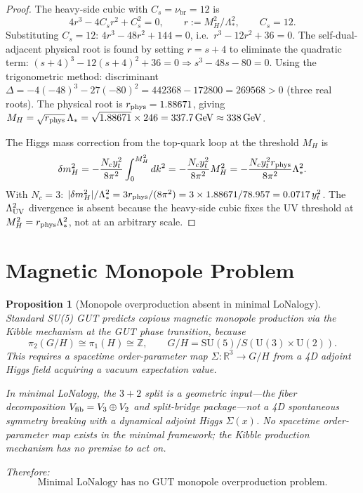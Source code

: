 \documentclass[12pt]{article}
\theoremstyle{plain}
\newtheorem{proposition}[theorem]{Proposition}
\theoremstyle{definition}
\numberwithin{equation}{section}
\newcommand{\br}{\mathrm{br}}
\begin{document}
\begin{proof}
The heavy-side cubic with $C_s=\nu_\br=12$ is
\[
4r^3 - 4C_s r^2 + C_s^2 = 0,\qquad r:=M_H^2/\Lambda_*^2,\qquad C_s=12.
\]
Substituting $C_s=12$: $4r^3-48r^2+144=0$, i.e.\ $r^3-12r^2+36=0$.
The self-dual-adjacent physical root is found by setting $r=s+4$ to eliminate the quadratic term:
$(s+4)^3-12(s+4)^2+36=0\Rightarrow s^3-48s-80=0$.
Using the trigonometric method: discriminant $\Delta=-4(-48)^3-27(-80)^2=442368-172800=269568>0$ (three real roots).
The physical root is $r_{\rm phys}=1.88671$, giving $M_H=\sqrt{r_{\rm phys}}\,\Lambda_*=\sqrt{1.88671}\times246=337.7\,\mathrm{GeV}\approx338\,\mathrm{GeV}$.

The Higgs mass correction from the top-quark loop at the threshold $M_H$ is
\[
\delta m_H^2 = -\frac{N_c y_t^2}{8\pi^2}\int_0^{M_H^2}dk^2 = -\frac{N_c y_t^2}{8\pi^2}M_H^2
= -\frac{N_c y_t^2 r_{\rm phys}}{8\pi^2}\Lambda_*^2.
\]
With $N_c=3$: $|\delta m_H^2|/\Lambda_*^2=3r_{\rm phys}/(8\pi^2)=3\times1.88671/78.957=0.0717\,y_t^2$.
The $\Lambda_{\rm UV}^2$ divergence is absent because the heavy-side cubic fixes the UV threshold at $M_H^2=r_{\rm phys}\Lambda_*^2$, not at an arbitrary scale.
\end{proof}

\section{Magnetic Monopole Problem}\label{sec:monopole}

\begin{proposition}[Monopole overproduction absent in minimal LoNalogy]\label{prop:monopole}
Standard SU(5) GUT predicts copious magnetic monopole production via the Kibble mechanism at the GUT phase transition, because
\[
\pi_2(G/H) \cong \pi_1(H) \cong \mathbb{Z}, \qquad G/H = \mathrm{SU}(5)/S(\mathrm{U}(3)\times\mathrm{U}(2)).
\]
This requires a spacetime order-parameter map $\Sigma:\mathbb{R}^3\to G/H$ from a 4D adjoint Higgs field acquiring a vacuum expectation value.

In minimal LoNalogy, the $3+2$ split is a \emph{geometric input}---the fiber decomposition $V_{\rm fib}=V_3\oplus V_2$ and split-bridge package---not a 4D spontaneous symmetry breaking with a dynamical adjoint Higgs $\Sigma(x)$.  No spacetime order-parameter map exists in the minimal framework; the Kibble production mechanism has no premise to act on.

Therefore:
\[
\boxed{\text{Minimal LoNalogy has no GUT monopole overproduction problem.}}
\]
\end{proposition}
\end{document}
